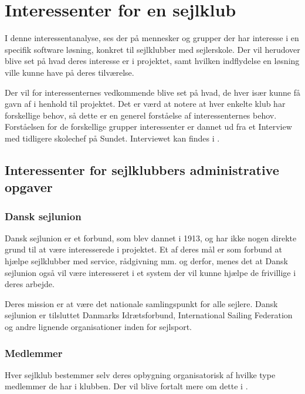 \chapter{Interessenter for en sejlklub}\label{chap:interessent-analyse-ved-sejlklubber}

I denne interessentanalyse, ses der på mennesker og grupper der har interesse i en specifik software løsning, konkret
til sejlklubber med sejlerskole. Der vil herudover blive set på hvad deres interesse er i projektet, samt hvilken
indflydelse en løsning ville kunne have på deres tilværelse.


Der vil for interessenternes vedkommende blive set på hvad, de hver især kunne få gavn af i henhold til projektet. 
Det er værd at notere at hver enkelte klub har forskellige behov, så dette er en generel forståelse af interessenternes
behov. Forståelsen for de forskellige grupper interessenter er dannet ud fra et Interview med tidligere skolechef på
Sundet. Interviewet kan findes i .

\section{Interessenter for sejlklubbers administrative opgaver}

\subsection{Dansk sejlunion}

Dansk sejlunion er et forbund, som blev dannet i 1913, og har ikke nogen direkte grund til at være interesserede i
projektet.
Et af deres mål er som forbund at hjælpe sejlklubber med service, rådgivning mm. og derfor, menes det at Dansk sejlunion
også vil være interesseret i et system der vil kunne hjælpe de frivillige i deres arbejde.

Deres mission er at være det nationale samlingspunkt for alle sejlere. Dansk sejlunion er tilsluttet Danmarks
Idrætsforbund, International Sailing Federation og andre lignende organisationer inden for sejlsport.
\citep{Sejlsportdk}


\subsection{Medlemmer}

Hver sejlklub bestemmer selv deres opbygning organisatorisk af hvilke type medlemmer de har i klubben. Der vil blive
fortalt mere om dette i . 

